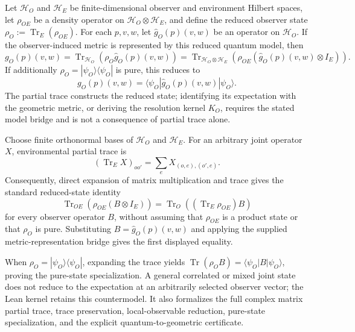 \begin{theorem}\label{theorem:bk4_quantum_measurement}
Let $\mathcal H_O$ and $\mathcal H_E$ be finite-dimensional observer and
environment Hilbert spaces, let $\rho_{OE}$ be a density operator on
$\mathcal H_O\otimes\mathcal H_E$, and define the reduced observer state
$\rho_O:=\operatorname{Tr}_E(\rho_{OE})$.  For each $p,v,w$, let
$\widehat g_O(p)(v,w)$ be an operator on $\mathcal H_O$.  If the
observer-induced metric is represented by this reduced quantum model, then
\begin{equation}
 g_O(p)(v,w)
 =\operatorname{Tr}_{\mathcal H_O}
   \!\left(\rho_O\widehat g_O(p)(v,w)\right)
 =\operatorname{Tr}_{\mathcal H_O\otimes\mathcal H_E}
   \!\left(\rho_{OE}(\widehat g_O(p)(v,w)\otimes I_E)\right).
\end{equation}
If additionally $\rho_O=|\psi_O\rangle\langle\psi_O|$ is pure, this reduces to
\begin{equation}
 g_O(p)(v,w)=
 \langle\psi_O|\widehat g_O(p)(v,w)|\psi_O\rangle.
\end{equation}
The partial trace constructs the reduced state; identifying its expectation
with the geometric metric, or deriving the resolution kernel $K_O$, requires
the stated model bridge and is not a consequence of partial trace alone.
\end{theorem}

\begin{demonstratio}
\label{demonstratio:bk4_quantum_measurement}
Choose finite orthonormal bases of $\mathcal H_O$ and $\mathcal H_E$.  For an
arbitrary joint operator $X$, environmental partial trace is
\[
 (\operatorname{Tr}_E X)_{oo'}=\sum_e X_{(o,e),(o',e)}.
\]
Consequently, direct expansion of matrix multiplication and trace gives the
standard reduced-state identity
\[
 \operatorname{Tr}_{OE}\!\left(\rho_{OE}(B\otimes I_E)\right)
 =\operatorname{Tr}_{O}\!\left((\operatorname{Tr}_E\rho_{OE})B\right)
\]
for every observer operator $B$, without assuming that $\rho_{OE}$ is a product
state or that $\rho_O$ is pure.  Substituting
$B=\widehat g_O(p)(v,w)$ and applying the supplied metric-representation bridge
gives the first displayed equality.

When $\rho_O=|\psi_O\rangle\langle\psi_O|$, expanding the trace yields
$\operatorname{Tr}(\rho_OB)=\langle\psi_O|B|\psi_O\rangle$, proving the
pure-state specialization.  A general correlated or mixed joint state does not
reduce to the expectation at an arbitrarily selected observer vector; the Lean
kernel retains this countermodel.  It also formalizes the full complex matrix
partial trace, trace preservation, local-observable reduction, pure-state
specialization, and the explicit quantum-to-geometric certificate.
\end{demonstratio}

